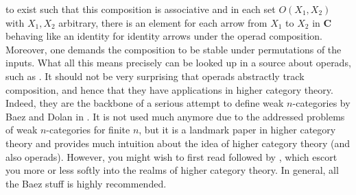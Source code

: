 to exist such that this composition is associative and in each set $O(X_{1},X_{2})$ with $X_{1},X_{2}$ arbitrary, there is an element for each arrow from $X_{1}$ to $X_{2}$ in $\mathbf{C}$ behaving like an identity for identity arrows under the operad composition.
Moreover, one demands the composition to be {\glqq}stable{\grqq} under permutations of the inputs.
What all this means precisely can be looked up in a source about operads, such as \cite{0d7b89ad}.
It should not be very surprising that operads abstractly track composition, and hence that they have applications in higher category theory.
Indeed, they are the backbone of a serious attempt to define weak $n$-categories by Baez and Dolan in \cite{0d7b89ad}.
It is not used much anymore due to the addressed problems of weak $n$-categories for finite $n$, but it is a landmark paper in higher category theory and provides much intuition about the idea of higher category theory (and also operads).
However, you might wish to first read \cite{de09a3f9} followed by \cite{c2d89e8a}, which escort you more or less softly into the realms of higher category theory.
In general, all the Baez stuff is highly recommended.
